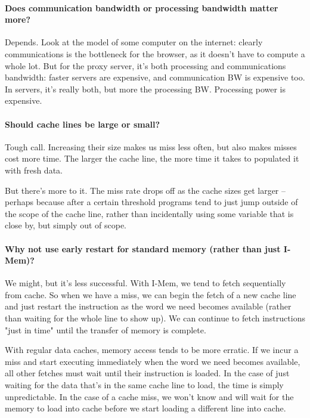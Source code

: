 \documentclass[a4paper]{article}
\begin{document}
\paragraph{Does communication bandwidth or processing bandwidth matter more?} Depends. Look at the model of some computer on the internet: clearly communications is the bottleneck for the browser, as it doesn't have to compute a whole lot. But for the proxy server, it's both processing and communications bandwidth: faster servers are expensive, and communication BW is expensive too. In servers, it's really both, but more the processing BW. Processing power is expensive.

\paragraph{Should cache lines be large or small?} Tough call. Increasing their size makes us miss less often, but also makes misses cost more time. The larger the cache line, the more time it takes to populated it with fresh data.

But there's more to it. The miss rate drops off as the cache sizes get larger -- perhaps because after a certain threshold programs tend to just jump outside of the scope of the cache line, rather than incidentally using some variable that is close by, but simply out of scope.

\paragraph{Why not use early restart for standard memory (rather than just I-Mem)?} We might, but it's less successful. With I-Mem, we tend to fetch sequentially from cache. So when we have a miss, we can begin the fetch of a new cache line and just restart the instruction as the word we need becomes available (rather than waiting for the whole line to show up). We can continue to fetch instructions "just in time" until the transfer of memory is complete.

With regular data caches, memory access tends to be more erratic. If we incur a miss and start executing immediately when the word we need becomes available, all other fetches must wait until their instruction is loaded. In the case of just waiting for the data that's in the same cache line to load, the time is simply unpredictable. In the case of a cache miss, we won't know and will wait for the memory to load into cache before we start loading a different line into cache.
\end{document}
